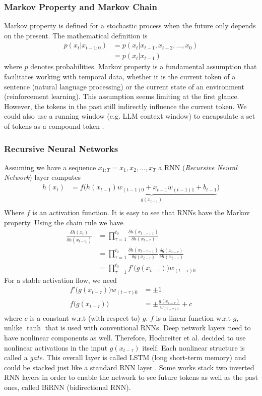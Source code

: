 \documentclass{article}
\begin{document}
\subsubsection{Markov Property and Markov Chain}
Markov property is defined for a stochastic process when the future only depends on the present. The mathematical definition is
\begin{align}
    p(x_t|x_{t-1:0}) &= p(x_t|x_{t-1},x_{t-2},...,x_0)\\
    &= p(x_t|x_{t-1})
\end{align}
where $p$ denotes probabilities. Markov property is a fundamental assumption that facilitates working with temporal data, whether it is the current token of a sentence (natural language processing) or the current state of an environment (reinforcement learning). This assumption seems limiting at the first glance. However, the tokens in the past still indirectly influence the current token. We could also use a running window (e.g. LLM context window) to encapsulate a set of tokens as a compound token \cite{karaca_ai-book_2024}.
\subsubsection{Recursive Neural Networks}
Assuming we have a sequence $x_{1:T} = x_1, x_2, ..., x_T$ a RNN (\textit{Recursive Neural Network}) layer computes 
\begin{align}
    h(x_t) &= f\big(\underbrace{h(x_{t-1})w_{(t-1)0} + x_{t-1}w_{(t-1)1} + b_{t-1}}_{g(x_{t-1})}\big)\\
\end{align}
Where $f$ is an activation function. It is easy to see that RNNs have the Markov property. Using the chain rule we have
\begin{align}
    \frac{\delta h(x_t)}{\delta h(x_{t-t_0})} 
    &= \prod_{\tau=1}^{t_0}\frac{\delta h(x_{t-\tau+1})}{\delta h(x_{t-\tau})}\\
    &= \prod_{\tau=1}^{t_0}\frac{\delta h(x_{t-\tau+1})}{\delta g(x_{t-\tau})}\frac{\delta g(x_{t-\tau})}{\delta h(x_{t-\tau})}\\
    &= \prod_{\tau=1}^{t_0}f'\Big(g(x_{t-\tau})\Big)w_{(t-\tau)0}
\end{align}
For a stable activation flow, we need 
\begin{align}
    f'\Big(g(x_{t-\tau})\Big)w_{(t-\tau)0} &= \pm 1\\
    f\Big(g(x_{t-\tau})\Big) &= \pm \frac{g(x_{t-\tau})}{w_{(t-\tau)0}} + c
\end{align}
where $c$ is a constant w.r.t (with respect to) $g$. $f$ is a linear function w.r.t $g$, unlike $\tanh$ that is used with conventional RNNs. Deep network layers need to have nonlinear components as well. Therefore, Hochreiter et al. decided to use nonlinear activations in the input $g(x_{t-\tau})$ itself. Each nonlinear structure is called a \textit{gate}. This overall layer is called LSTM (long short-term memory) and could be stacked just like a standard RNN layer \cite{hochreiter_long_1997}. Some works stack two inverted RNN layers in order to enable the network to see future tokens as well as the past ones, called BiRNN (bidirectional RNN).
\end{document}

